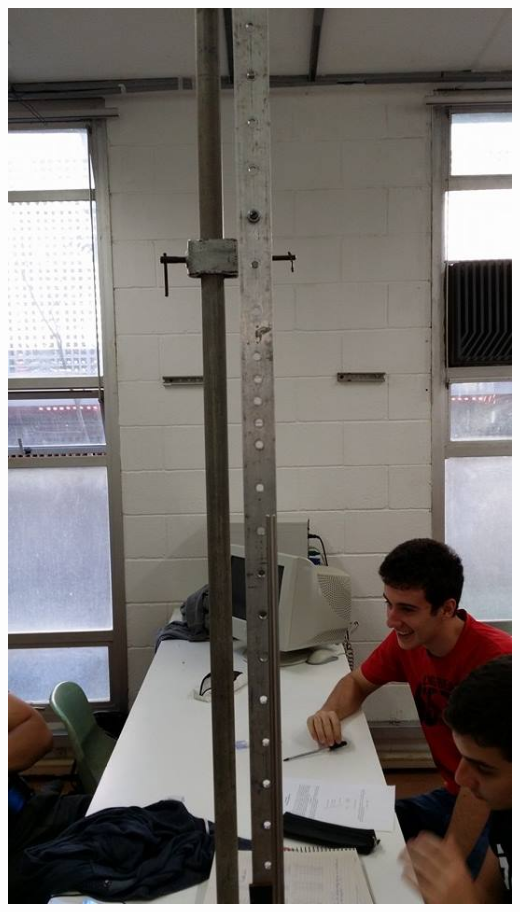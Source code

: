 \documentclass[12pt,a4paper]{article}
\begin{document}
\includegraphics[scale=0.30]{2.jpg} 
\end{document}
